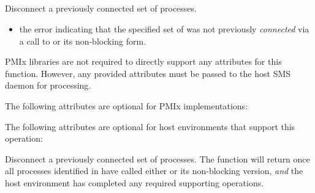\subsection{}

\summary

Disconnect a previously connected set of processes.

\format


\begin{arglist}
\end{arglist}

\returnstart
\begin{itemize}
    \item the  error indicating that the specified set of  was not previously \textit{connected} via a call to  or its non-blocking form.
\end{itemize}
\returnend

\reqattrstart
\ac{PMIx} libraries are not required to directly support any attributes for this function. However, any provided attributes must be passed to the host \ac{SMS} daemon for processing.

\reqattrend

\optattrstart
The following attributes are optional for \ac{PMIx} implementations:



The following attributes are optional for host environments that support this operation:


\optattrend

\descr

Disconnect a previously connected set of processes. The function will return once all processes identified in  have called either  or its non-blocking version, \textit{and} the host environment has completed any required supporting operations.

